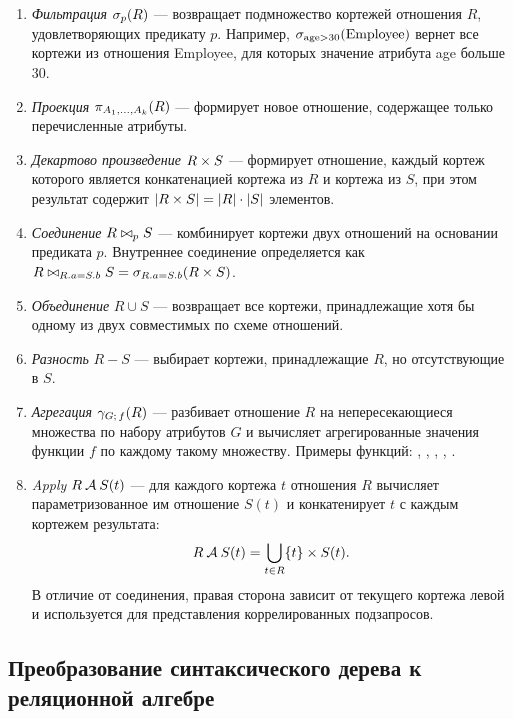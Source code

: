 \documentclass[fontsize=14pt, russian]{scrartcl}
\begin{document}
\begin{enumerate}
  \item \emph{Фильтрация} \(\sigma_{p}(R)\) --- возвращает подмножество кортежей
        отношения \(R\), удовлетворяющих предикату \(p\). Например,
        \(\sigma_{\text{age} > 30}(\text{Employee})\) вернет все кортежи из
        отношения Employee, для которых значение атрибута age больше 30.
  \item \emph{Проекция} \(\pi_{A_1, \ldots, A_k}(R)\) --- формирует новое
        отношение, содержащее только перечисленные атрибуты.
  \item \emph{Декартово произведение} \(R \times S\) --- формирует отношение,
        каждый кортеж которого является конкатенацией кортежа из \(R\) и кортежа
        из \(S\), при этом результат содержит \(|R \times S| = |R| \cdot |S|\)
        элементов.
  \item \emph{Соединение} \(R \bowtie_{p} S\) --- комбинирует кортежи двух
        отношений на основании предиката \(p\). Внутреннее соединение
        определяется как
        \(R \bowtie_{R.a = S.b} S = \sigma_{R.a = S.b}(R \times S)\).
  \item \emph{Объединение} \(R \cup S\) --- возвращает все кортежи,
        принадлежащие хотя бы одному из двух совместимых по схеме отношений.
  \item \emph{Разность} \(R - S\) --- выбирает кортежи, принадлежащие \(R\), но
        отсутствующие в \(S\).
  \item \emph{Агрегация} \(\gamma_{G;\,f}(R)\) --- разбивает отношение \(R\) на
        непересекающиеся множества по набору атрибутов \(G\) и вычисляет
        агрегированные значения функции \(f\) по каждому такому множеству.
        Примеры функций: \COUNT, \SUM, \AVG, \MIN, \MAX.
  \item \emph{Apply} \(R \mathbin{\mathcal{A}} S(t)\) --- для каждого кортежа \(t\)
        отношения \(R\) вычисляет параметризованное им отношение \(S(t)\) и
        конкатенирует \(t\) с каждым кортежем результата:
        \[
          R \mathbin{\mathcal{A}} S(t) = \bigcup_{t \in R} \{t\} \times S(t).
        \]
        В отличие от соединения, правая сторона зависит от текущего кортежа
        левой и используется для представления коррелированных подзапросов.
\end{enumerate}

\subsection{Преобразование синтаксического дерева к реляционной алгебре}\label{sec:translation}
\end{document}
